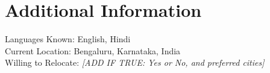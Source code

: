 \documentclass[letterpaper,11pt]{article}
\begin{document}
\section*{Additional Information}

Languages Known: English, Hindi \\
Current Location: Bengaluru, Karnataka, India \\
Willing to Relocate: \textit{[ADD IF TRUE: Yes or No, and preferred cities]}
\end{document}
